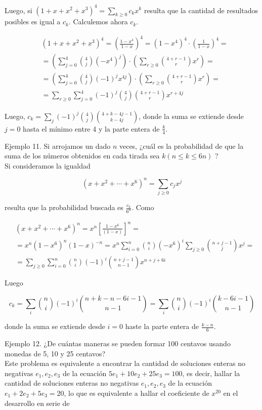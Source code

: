 \documentclass[10pt]{article}
\begin{document}
Luego, si $\left(1+x+x^{2}+x^{3}\right)^{4}=\sum_{k \geq 0} c_{k} x^{k}$ resulta que la cantidad de resultados posibles es igual a $c_{k}$. Calculemos ahora $c_{k}$.

$$
\begin{aligned}
& \left(1+x+x^{2}+x^{3}\right)^{4}=\left(\frac{1-x^{4}}{1-x}\right)^{4}=\left(1-x^{4}\right)^{4} \cdot\left(\frac{1}{1-x}\right)^{4}= \\
& =\left(\sum_{j=0}^{4}\binom{4}{j}\left(-x^{4}\right)^{j}\right) \cdot\left(\sum_{r \geq 0}\binom{4+r-1}{r} x^{r}\right)= \\
& =\left(\sum_{j=0}^{4}\binom{4}{j}(-1)^{j} x^{4 j}\right) \cdot\left(\sum_{r \geq 0}\binom{4+r-1}{r} x^{r}\right)= \\
& =\sum_{r \geq 0} \sum_{j=0}^{4}(-1)^{j}\binom{4}{j}\binom{4+r-1}{r} x^{r+4 j}
\end{aligned}
$$

Luego, $c_{k}=\sum_{j}(-1)^{j}\binom{4}{j}\binom{4+k-4 j-1}{k-4 j}$, donde la suma se extiende desde $j=0$ hasta el mínimo entre 4 y la parte entera de $\frac{k}{4}$.

Ejemplo 11. Si arrojamos un dado $n$ veces, ¿cuál es la probabilidad de que la suma de los números obtenidos en cada tirada sea $k(n \leq k \leq 6 n)$ ?\\
Si consideramos la igualdad

$$
\left(x+x^{2}+\cdots+x^{6}\right)^{n}=\sum_{j \geq 0} c_{j} x^{j}
$$

resulta que la probabilidad buscada es $\frac{c_{k}}{6^{n}}$. Como

$$
\begin{aligned}
& \left(x+x^{2}+\cdots+x^{6}\right)^{n}=x^{n}\left[\frac{1-x^{6}}{(1-x)}\right]^{n}= \\
& =x^{n}\left(1-x^{6}\right)^{n}(1-x)^{-n}=x^{n} \sum_{i=0}^{n}\binom{n}{i}\left(-x^{6}\right)^{i} \sum_{j \geq 0}\binom{n+j-1}{j} x^{j}= \\
& =\sum_{j \geq 0} \sum_{i=0}^{n}\binom{n}{i}(-1)^{i}\binom{n+j-1}{n-1} x^{n+j+6 i}
\end{aligned}
$$

Luego

$$
c_{k}=\sum_{i}\binom{n}{i}(-1)^{i}\binom{n+k-n-6 i-1}{n-1}=\sum_{i}\binom{n}{i}(-1)^{i}\binom{k-6 i-1}{n-1}
$$

donde la suma se extiende desde $i=0$ haste la parte entera de $\frac{k-n}{6}$.

Ejemplo 12. ¿De cuántas maneras se pueden formar 100 centavos usando monedas de 5, 10 y 25 centavos?\\
Este problema es equivalente a encontrar la cantidad de soluciones enteras no negativas $e_{1}, e_{2}, e_{3}$ de la ecuación $5 e_{1}+10 e_{2}+25 e_{3}=100$, es decir, hallar la cantidad de soluciones enteras no negativas $e_{1}, e_{2}, e_{3}$ de la ecuación $e_{1}+2 e_{2}+5 e_{3}=20$, lo que es equivalente a hallar el coeficiente de $x^{20}$ en el desarrollo en serie de
\end{document}
